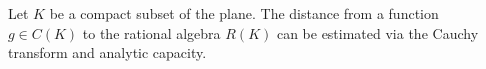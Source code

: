 
Let $K$ be a compact subset of the plane. The distance from a function $g \in C(K)$ to the rational algebra $R(K)$ can be estimated via the Cauchy transform and analytic capacity.
